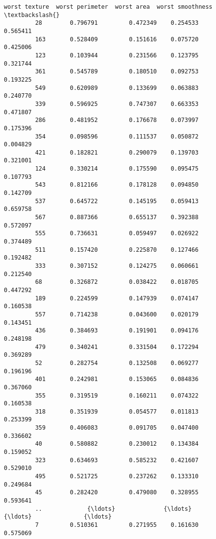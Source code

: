 \documentclass[11pt]{article}
\begin{document}
\begin{Verbatim}[commandchars=\\\{\}]
              worst texture  worst perimeter  worst area  worst smoothness  \textbackslash{}
         28        0.796791         0.472349    0.254533          0.565411   
         163       0.528409         0.151616    0.075720          0.425006   
         123       0.103944         0.231566    0.123795          0.321744   
         361       0.545789         0.180510    0.092753          0.193225   
         549       0.620989         0.133699    0.063883          0.240770   
         339       0.596925         0.747307    0.663353          0.471807   
         286       0.481952         0.176678    0.073997          0.175396   
         354       0.098596         0.111537    0.050872          0.004829   
         421       0.182821         0.290079    0.139703          0.321001   
         124       0.330214         0.175590    0.095475          0.107793   
         543       0.812166         0.178128    0.094850          0.142709   
         537       0.645722         0.145195    0.059413          0.659758   
         567       0.887366         0.655137    0.392388          0.572097   
         555       0.736631         0.059497    0.026922          0.374489   
         511       0.157420         0.225870    0.127466          0.192482   
         333       0.307152         0.124275    0.060661          0.212540   
         68        0.326872         0.038422    0.018705          0.447292   
         189       0.224599         0.147939    0.074147          0.160538   
         557       0.714238         0.043600    0.020179          0.143451   
         436       0.384693         0.191901    0.094176          0.248198   
         479       0.340241         0.331504    0.172294          0.369289   
         52        0.282754         0.132508    0.069277          0.196196   
         401       0.242981         0.153065    0.084836          0.367060   
         355       0.319519         0.160211    0.074322          0.160538   
         318       0.351939         0.054577    0.011813          0.253399   
         359       0.406083         0.091705    0.047400          0.336602   
         40        0.580882         0.230012    0.134384          0.159052   
         323       0.634693         0.585232    0.421607          0.529010   
         495       0.521725         0.237262    0.133310          0.249684   
         45        0.282420         0.479080    0.328955          0.593641   
         ..             {\ldots}              {\ldots}         {\ldots}               {\ldots}   
         7         0.510361         0.271955    0.161630          0.575069   

\end{Verbatim}
\end{document}
